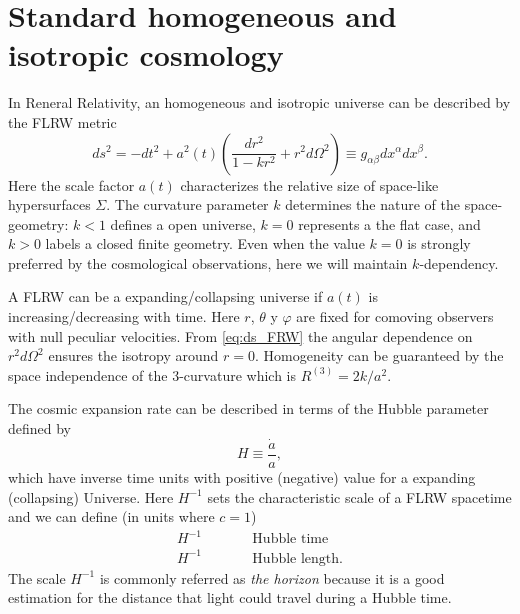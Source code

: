 \documentclass[12pt,letterpaper,twoside]{book}
\begin{document}



\section{ Standard homogeneous and isotropic cosmology}
\label{sec:homogeneous_universe}


In Reneral Relativity, an homogeneous and isotropic universe can be described by
the FLRW metric
\begin{equation}
     \label{eq:ds_FRW}
    ds^2 = - dt^2+a^2 (t)\left(\frac{dr^2}{1-kr^2}+r^2 d\Omega^2\right)
             \equiv g_{\alpha \beta}dx^\alpha dx^\beta.
\end{equation}
Here the scale factor $a(t)$ characterizes the relative size of space-like
hypersurfaces $\Sigma$. The curvature parameter $k$ determines the nature of the
space-geometry: $k<1$ defines a open universe, $k=0$ represents a the flat case,
and $k>0$ labels a closed finite geometry.
Even when the value $k=0$ is strongly preferred by the cosmological
observations, here we will maintain $k$-dependency.

A FLRW can be a expanding/collapsing universe if $a(t)$ is increasing/decreasing
with time. Here $r$, $\theta$ y $\varphi$ are fixed for comoving observers with
null peculiar velocities.  From \eqref{eq:ds_FRW} the angular dependence on $r^2
d\Omega^2$ ensures the isotropy around $r=0$. Homogeneity can be guaranteed by
the space independence of the 3-curvature which is $R^{(3)}=2k/a^2$.


The cosmic expansion rate can be described in terms of the Hubble parameter
defined by
\begin{equation}
    H\equiv \frac{\dot{a}}{a},
\end{equation}
which have inverse time units with positive (negative) value for a expanding
(collapsing) Universe. Here $H^{-1}$ sets the characteristic
scale of a FLRW spacetime and we can define (in units where $c=1$)
\begin{eqnarray}
    H^{-1} & \qquad & \mbox{Hubble time}\\
    H^{-1} & \qquad & \mbox{Hubble length}.
\end{eqnarray}
The scale $H^{-1}$ is commonly referred as \textit{the horizon}
because it is a good estimation for the distance that light could travel during a
Hubble time.
\end{document}
